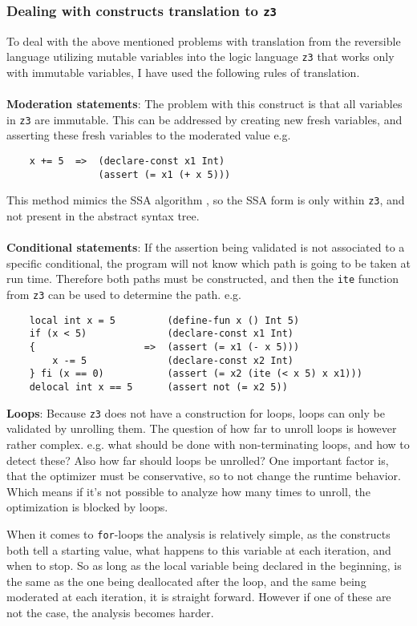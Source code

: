 \subsubsection{Dealing with \lan constructs translation to \texttt{z3}} \label{sec:dealingWithz3}
\label{translation-to-z3}
To deal with the above mentioned problems with translation from the reversible language \lan
utilizing mutable variables into the logic language \texttt{z3} that works only with immutable
variables, I have used the following rules of translation.
\\
\\
\textbf{Moderation statements}: The problem with this construct is that all variables in
\texttt{z3} are immutable. This can be addressed by creating new fresh variables, and asserting
these fresh variables to the moderated value e.g.
\begin{verbatim}
    x += 5  =>  (declare-const x1 Int)
                (assert (= x1 (+ x 5)))
\end{verbatim}
\noindent
This method mimics the SSA algorithm \cite{SSA}, so the SSA form is only within \texttt{z3}, and
not present in the abstract syntax tree.
\\
\\
\textbf{Conditional statements}:
If the assertion being validated is not associated to a specific conditional, the program will
not know which path is going to be taken at run time. Therefore both paths must be constructed,
and then the \texttt{ite} function from \texttt{z3} can be used to determine the path. e.g.
\begin{verbatim}
    local int x = 5         (define-fun x () Int 5)
    if (x < 5)              (declare-const x1 Int)
    {                   =>  (assert (= x1 (- x 5)))
        x -= 5              (declare-const x2 Int)
    } fi (x == 0)           (assert (= x2 (ite (< x 5) x x1)))
    delocal int x == 5      (assert not (= x2 5))
\end{verbatim}
\noindent
\textbf{Loops}:
Because \texttt{z3} does not have a construction for loops, loops can only be validated by unrolling
them. The question of how far to unroll loops is however rather complex. e.g. what should be done
with non-terminating loops, and how to detect these? Also how far should loops be unrolled? One
important factor is, that the optimizer must be conservative, so to not change the runtime behavior.
Which means if it's not possible to analyze how many times to unroll, the optimization is blocked
by loops.

When it comes to \texttt{for}-loops the analysis is relatively simple, as the constructs both
tell a starting value, what happens to this variable at each iteration, and when to stop.
So as long as the local variable being declared in the beginning, is the same as the one being
deallocated after the loop, and the same being moderated at each iteration, it is straight forward.
However if one of these are not the case, the analysis becomes harder.

